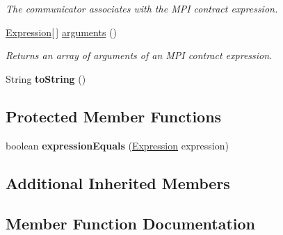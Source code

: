 \begin{DoxyCompactItemize}
\begin{DoxyCompactList}\small\item\em The communicator associates with the M\+P\+I contract expression. \end{DoxyCompactList}\item 
\hyperlink{interfaceedu_1_1udel_1_1cis_1_1vsl_1_1civl_1_1model_1_1IF_1_1expression_1_1Expression}{Expression}\mbox{[}$\,$\mbox{]} \hyperlink{classedu_1_1udel_1_1cis_1_1vsl_1_1civl_1_1model_1_1common_1_1expression_1_1CommonMPIContractExpression_a8a225a594d92a2ac1dd38302bcef4f28}{arguments} ()
\begin{DoxyCompactList}\small\item\em Returns an array of arguments of an M\+P\+I contract expression. \end{DoxyCompactList}\item 
\hypertarget{classedu_1_1udel_1_1cis_1_1vsl_1_1civl_1_1model_1_1common_1_1expression_1_1CommonMPIContractExpression_aa35978aeb7cb1ff1c7f1e9e8f40365fe}{}String {\bfseries to\+String} ()\label{classedu_1_1udel_1_1cis_1_1vsl_1_1civl_1_1model_1_1common_1_1expression_1_1CommonMPIContractExpression_aa35978aeb7cb1ff1c7f1e9e8f40365fe}

\end{DoxyCompactItemize}
\subsection*{Protected Member Functions}
\begin{DoxyCompactItemize}
\item 
\hypertarget{classedu_1_1udel_1_1cis_1_1vsl_1_1civl_1_1model_1_1common_1_1expression_1_1CommonMPIContractExpression_a4d6eedc61503222dd988d9795243a538}{}boolean {\bfseries expression\+Equals} (\hyperlink{interfaceedu_1_1udel_1_1cis_1_1vsl_1_1civl_1_1model_1_1IF_1_1expression_1_1Expression}{Expression} expression)\label{classedu_1_1udel_1_1cis_1_1vsl_1_1civl_1_1model_1_1common_1_1expression_1_1CommonMPIContractExpression_a4d6eedc61503222dd988d9795243a538}

\end{DoxyCompactItemize}
\subsection*{Additional Inherited Members}


\subsection{Member Function Documentation}
\hypertarget{classedu_1_1udel_1_1cis_1_1vsl_1_1civl_1_1model_1_1common_1_1expression_1_1CommonMPIContractExpression_a8a225a594d92a2ac1dd38302bcef4f28}{}
